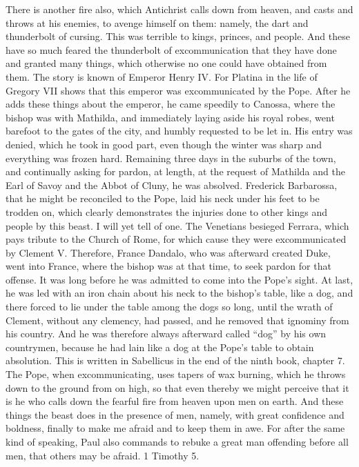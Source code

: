 There is another fire also, which Antichrist calls down from heaven, and casts and throws at his enemies, to avenge himself on them: namely, the dart and thunderbolt of cursing. This was terrible to kings, princes, and people. And these have so much feared the thunderbolt of excommunication that they have done and granted many things, which otherwise no one could have obtained from them. The story is known of Emperor Henry IV. For Platina in the life of Gregory VII shows that this emperor was excommunicated by the Pope. After he adds these things about the emperor, he came speedily to Canossa, where the bishop was with Mathilda, and immediately laying aside his royal robes, went barefoot to the gates of the city, and humbly requested to be let in. His entry was denied, which he took in good part, even though the winter was sharp and everything was frozen hard. Remaining three days in the suburbs of the town, and continually asking for pardon, at length, at the request of Mathilda and the Earl of Savoy and the Abbot of Cluny, he was absolved. Frederick Barbarossa, that he might be reconciled to the Pope, laid his neck under his feet to be trodden on, which clearly demonstrates the injuries done to other kings and people by this beast. I will yet tell of one. The Venetians besieged Ferrara, which pays tribute to the Church of Rome, for which cause they were excommunicated by Clement V. Therefore, France Dandalo, who was afterward created Duke, went into France, where the bishop was at that time, to seek pardon for that offense. It was long before he was admitted to come into the Pope’s sight. At last, he was led with an iron chain about his neck to the bishop’s table, like a dog, and there forced to lie under the table among the dogs so long, until the wrath of Clement, without any clemency, had passed, and he removed that ignominy from his country. And he was therefore always afterward called “dog” by his own countrymen, because he had lain like a dog at the Pope’s table to obtain absolution. This is written in Sabellicus in the end of the ninth book, chapter 7. The Pope, when excommunicating, uses tapers of wax burning, which he throws down to the ground from on high, so that even thereby we might perceive that it is he who calls down the fearful fire from heaven upon men on earth. And these things the beast does in the presence of men, namely, with great confidence and boldness, finally to make me afraid and to keep them in awe. For after the same kind of speaking, Paul also commands to rebuke a great man offending before all men, that others may be afraid. 1 Timothy 5.

